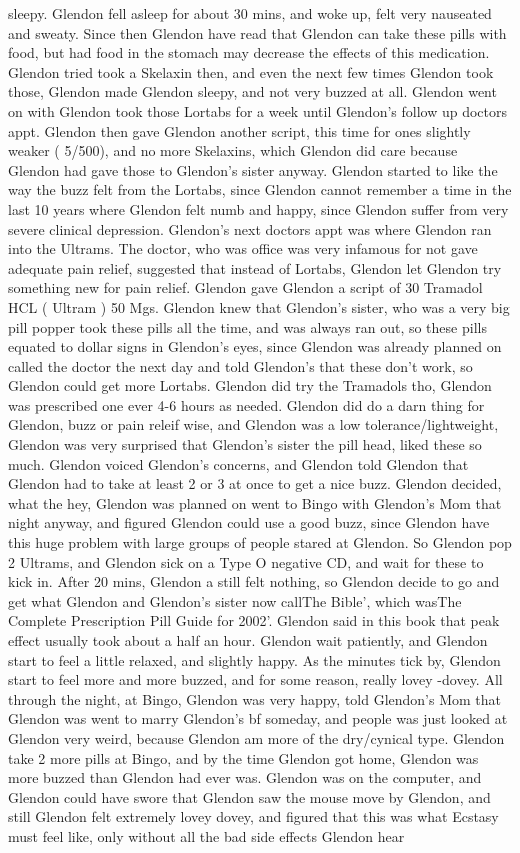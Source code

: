 \documentclass[12pt]{book}
\begin{document}
sleepy. Glendon fell asleep for about 30 mins, and woke up, felt very nauseated and sweaty. Since then Glendon have read that Glendon can take these pills with food, but had food in the stomach may decrease the effects of this medication. Glendon tried took a Skelaxin then, and even the next few times Glendon took those, Glendon made Glendon sleepy, and not very buzzed at all. Glendon went on with Glendon took those Lortabs for a week until Glendon's follow up doctors appt. Glendon then gave Glendon another script, this time for ones slightly weaker ( 5/500), and no more Skelaxins, which Glendon did care because Glendon had gave those to Glendon's sister anyway. Glendon started to like the way the buzz felt from the Lortabs, since Glendon cannot remember a time in the last 10 years where Glendon felt numb and happy, since Glendon suffer from very severe clinical depression. Glendon's next doctors appt was where Glendon ran into the Ultrams. The doctor, who was office was very infamous for not gave adequate pain relief, suggested that instead of Lortabs, Glendon let Glendon try something new for pain relief. Glendon gave Glendon a script of 30 Tramadol HCL ( Ultram ) 50 Mgs. Glendon knew that Glendon's sister, who was a very big pill popper took these pills all the time, and was always ran out, so these pills equated to dollar signs in Glendon's eyes, since Glendon was already planned on called the doctor the next day and told Glendon's that these don't work, so Glendon could get more Lortabs. Glendon did try the Tramadols tho, Glendon was prescribed one ever 4-6 hours as needed. Glendon did do a darn thing for Glendon, buzz or pain releif wise, and Glendon was a low tolerance/lightweight, Glendon was very surprised that Glendon's sister the pill head, liked these so much. Glendon voiced Glendon's concerns, and Glendon told Glendon that Glendon had to take at least 2 or 3 at once to get a nice buzz. Glendon decided, what the hey, Glendon was planned on went to Bingo with Glendon's Mom that night anyway, and figured Glendon could use a good buzz, since Glendon have this huge problem with large groups of people stared at Glendon. So Glendon pop 2 Ultrams, and Glendon sick on a Type O negative CD, and wait for these to kick in. After 20 mins, Glendon a still felt nothing, so Glendon decide to go and get what Glendon and Glendon's sister now callThe Bible', which wasThe Complete Prescription Pill Guide for 2002'. Glendon said in this book that peak effect usually took about a half an hour. Glendon wait patiently, and Glendon start to feel a little relaxed, and slightly happy. As the minutes tick by, Glendon start to feel more and more buzzed, and for some reason, really lovey -dovey. All through the night, at Bingo, Glendon was very happy, told Glendon's Mom that Glendon was went to marry Glendon's bf someday, and people was just looked at Glendon very weird, because Glendon am more of the dry/cynical type. Glendon take 2 more pills at Bingo, and by the time Glendon got home, Glendon was more buzzed than Glendon had ever was. Glendon was on the computer, and Glendon could have swore that Glendon saw the mouse move by Glendon, and still Glendon felt extremely lovey dovey, and figured that this was what Ecstasy must feel like, only without all the bad side effects Glendon hear 
\end{document}

